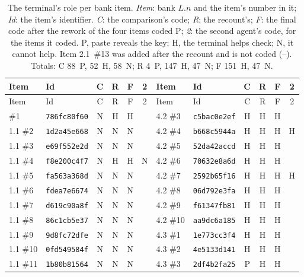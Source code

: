 {\footnotesize
\begin{longtable}{@{}llcccc@{\hspace{2em}}llcccc@{}}
  \caption{The terminal's role per bank item.  \emph{Item}: bank $L.n$
    and the item's number in it; \emph{Id}: the item's identifier.
    \emph{C}: the comparison's code; \emph{R}: the recount's; \emph{F}:
    the final code after the rework of the four items coded P;
    \emph{2}: the second agent's code, for the items it coded.  P, paste
    reveals the key; H, the terminal helps check; N, it cannot help.
    Item 2.1~\#13 was added after the recount and is not coded (--).
    Totals: C 88~P, 52~H, 58~N; R 4~P, 147~H, 47~N; F 151~H,
    47~N.}\label{tab:codes}\\
  \toprule
  Item & Id & C & R & F & 2 & Item & Id & C & R & F & 2 \\
  \midrule
  \endfirsthead
  \toprule
  Item & Id & C & R & F & 2 & Item & Id & C & R & F & 2 \\
  \midrule
  \endhead
  \bottomrule
  \endfoot
    1.1 \#1 & \texttt{786fc80f60} & N & H & H & &
     4.2 \#3 & \texttt{c5bac0e2ef} & H & H & H &  \\
    1.1 \#2 & \texttt{1d2a45e668} & N & N & N & &
     4.2 \#4 & \texttt{b668c5944a} & H & H & H & H \\
    1.1 \#3 & \texttt{e69f552e2d} & N & N & N & &
     4.2 \#5 & \texttt{52da42accd} & H & H & H &  \\
    1.1 \#4 & \texttt{f8e200c4f7} & N & H & H & N &
     4.2 \#6 & \texttt{70632e8a6d} & H & H & H &  \\
    1.1 \#5 & \texttt{fa563a368d} & N & N & N & &
     4.2 \#7 & \texttt{2592b65f16} & H & H & H & H \\
    1.1 \#6 & \texttt{fdea7e6674} & N & N & N & &
     4.2 \#8 & \texttt{06d792e3fa} & H & H & H &  \\
    1.1 \#7 & \texttt{d619c90a8f} & N & N & N & &
     4.2 \#9 & \texttt{f61347fb81} & H & H & H &  \\
    1.1 \#8 & \texttt{86c1cb5e37} & N & N & N & &
     4.2 \#10 & \texttt{aa9dc6a185} & H & H & H &  \\
    1.1 \#9 & \texttt{9d8fc72dfe} & N & N & N & &
     4.3 \#1 & \texttt{1e773cc3f4} & H & H & H &  \\
    1.1 \#10 & \texttt{0fd549584f} & N & N & N & &
     4.3 \#2 & \texttt{4e5133d141} & H & H & H &  \\
    1.1 \#11 & \texttt{1b80b81564} & N & N & N & &
     4.3 \#3 & \texttt{2df4b2fa25} & P & H & H &  \\

\end{longtable}}
